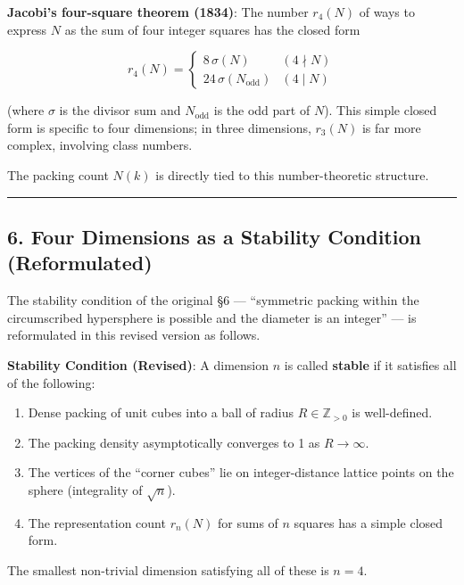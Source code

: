 \documentclass[a4paper,11pt]{article}
\theoremstyle{definition}
\providecommand{\tightlist}{\setlength{\itemsep}{0pt}\setlength{\parskip}{0pt}}
\begin{document}
\textbf{Jacobi's four-square theorem (1834)}: The number \(r_4(N)\) of
ways to express \(N\) as the sum of four integer squares has the closed
form

\[r_4(N) = \begin{cases} 8\,\sigma(N) & (4 \nmid N) \\ 24\,\sigma(N_{\text{odd}}) & (4 \mid N) \end{cases}\]

(where \(\sigma\) is the divisor sum and \(N_{\text{odd}}\) is the odd
part of \(N\)). This simple closed form is specific to four dimensions;
in three dimensions, \(r_3(N)\) is far more complex, involving class
numbers.

The packing count \(N(k)\) is directly tied to this number-theoretic
structure.

\begin{center}\rule{0.5\linewidth}{0.5pt}\end{center}

\subsection{6. Four Dimensions as a Stability Condition
(Reformulated)}\label{four-dimensions-as-a-stability-condition-reformulated}

The stability condition of the original §6 --- ``symmetric packing
within the circumscribed hypersphere is possible and the diameter is an
integer'' --- is reformulated in this revised version as follows.

\textbf{Stability Condition (Revised)}: A dimension \(n\) is called
\textbf{stable} if it satisfies all of the following:

\begin{enumerate}
\def\labelenumi{\arabic{enumi}.}
\tightlist
\item
  Dense packing of unit cubes into a ball of radius
  \(R \in \mathbb{Z}_{>0}\) is well-defined.
\item
  The packing density asymptotically converges to 1 as \(R \to \infty\).
\item
  The vertices of the ``corner cubes'' lie on integer-distance lattice
  points on the sphere (integrality of \(\sqrt{n}\)).
\item
  The representation count \(r_n(N)\) for sums of \(n\) squares has a
  simple closed form.
\end{enumerate}

The smallest non-trivial dimension satisfying all of these is
\textbf{\(n = 4\)}.
\end{document}
